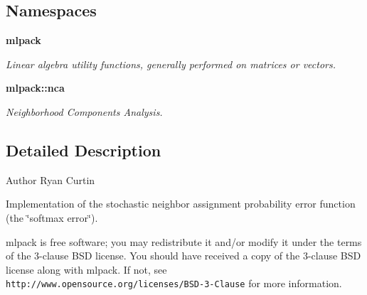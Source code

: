 \subsection*{Namespaces}
\begin{DoxyCompactItemize}
\item 
 \textbf{ mlpack}
\begin{DoxyCompactList}\small\item\em Linear algebra utility functions, generally performed on matrices or vectors. \end{DoxyCompactList}\item 
 \textbf{ mlpack\+::nca}
\begin{DoxyCompactList}\small\item\em Neighborhood Components Analysis. \end{DoxyCompactList}\end{DoxyCompactItemize}


\subsection{Detailed Description}
\begin{DoxyAuthor}{Author}
Ryan Curtin
\end{DoxyAuthor}
Implementation of the stochastic neighbor assignment probability error function (the \char`\"{}softmax error\char`\"{}).

mlpack is free software; you may redistribute it and/or modify it under the terms of the 3-\/clause B\+SD license. You should have received a copy of the 3-\/clause B\+SD license along with mlpack. If not, see {\tt http\+://www.\+opensource.\+org/licenses/\+B\+S\+D-\/3-\/\+Clause} for more information. 